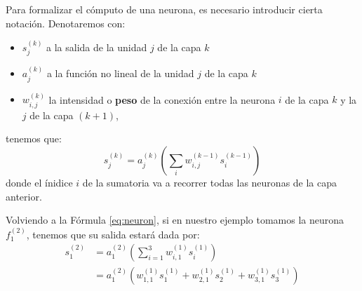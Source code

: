 \documentclass[../../main.tex]{subfiles}
\begin{document}
Para formalizar el cómputo de una neurona, es necesario introducir cierta notación.
Denotaremos con:
\begin{itemize}[itemsep=0.1cm]
    \item \(s^{(k)}_j\) a la salida de la unidad \(j\) de la capa \(k\)
    \item \(a^{(k)}_j\) a la función no lineal de la unidad \(j\) de la capa \(k\)
    \item \(w^{(k)}_{i,j}\) la intensidad o \textbf{peso} de la conexión entre la
    neurona \(i\) de la capa \(k\) y la \(j\) de la capa \((k+1)\),
\end{itemize}
tenemos que:
\begin{equation}
    s^{(k)}_j = a^{(k)}_j \left( \sum_i w^{(k-1)}_{i,j} s^{(k-1)}_i \right)
    \label{eq:neuron}
\end{equation}
donde el ínidice \(i\) de la sumatoria va a recorrer todas las neuronas de la capa
anterior.





Volviendo a la Fórmula \ref{eq:neuron}, si en nuestro ejemplo tomamos la neurona
\(f^{(2)}_1\), tenemos que su salida estará dada por:
\begin{align*}
    s^{(2)}_1 &= a^{(2)}_1 \left( \sum_{i=1}^{3} w^{(1)}_{i,1} s^{(1)}_i \right) \\
              &= a^{(2)}_1 \left( w^{(1)}_{1,1}s^{(1)}_1 +  w^{(1)}_{2,1}s^{(1)}_2 + w^{(1)}_{3,1}s^{(1)}_3 \right)
\end{align*}
\end{document}
